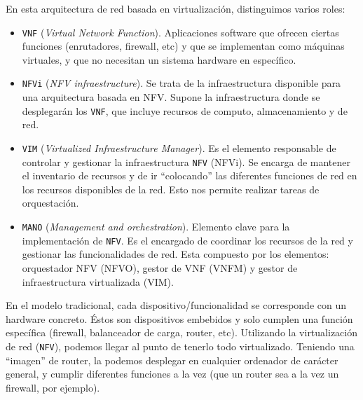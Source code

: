 \documentclass[a4paper, oneside, 12pt]{book}
\begin{document}
	\noindent En esta arquitectura de red basada en virtualización, distinguimos varios roles: 
	\begin{itemize}
		\item \texttt{VNF} (\textit{Virtual Network Function}). Aplicaciones software que ofrecen ciertas funciones (enrutadores, firewall, etc) y que se implementan como máquinas virtuales, y que no necesitan un sistema hardware en específico. 
		
		\item \texttt{NFVi} (\textit{NFV infraestructure}). Se trata de la infraestructura disponible para una arquitectura basada en NFV. Supone la infraestructura donde se desplegarán los \texttt{VNF}, que incluye recursos de computo, almacenamiento y de red. 
		
		\item \texttt{VIM} (\textit{Virtualized Infraestructure Manager}). Es el elemento responsable de controlar y gestionar la infraestructura \texttt{NFV} (NFVi). Se encarga de mantener el inventario de recursos y de ir ``colocando'' las diferentes funciones de red en los recursos disponibles de la red. Esto nos permite realizar tareas de orquestación.
		
		\item \texttt{MANO} (\textit{Management and orchestration}). Elemento clave para la implementación de \texttt{NFV}. Es el encargado de coordinar los recursos de la red y gestionar las funcionalidades de red. Esta compuesto por los elementos: orquestador NFV (NFVO), gestor de VNF (VNFM) y gestor de infraestructura virtualizada (VIM).
	\end{itemize}
	
	\pagebreak
	
	\noindent En el modelo tradicional, cada dispositivo/funcionalidad se corresponde con un hardware concreto. Éstos son dispositivos embebidos y solo cumplen una función específica (firewall, balanceador de carga, router, etc). Utilizando la virtualización de red (\texttt{NFV}), podemos llegar al punto de tenerlo todo virtualizado. Teniendo una ``imagen'' de router, la podemos desplegar en cualquier ordenador de carácter general, y cumplir diferentes funciones a la vez (que un router sea a la vez un firewall, por ejemplo). \\
	
\end{document}

